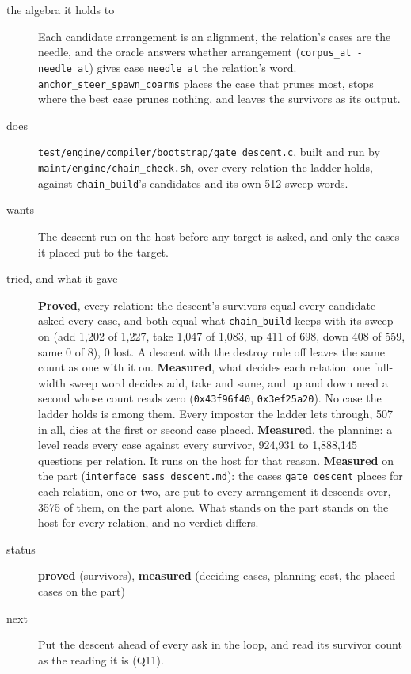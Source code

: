 \begin{description}
\item[{the algebra it holds to}] Each candidate arrangement is an alignment, the relation's cases are the needle, and the oracle answers whether arrangement (\texttt{corpus\_\allowbreak{}at -\allowbreak{} needle\_\allowbreak{}at}) gives case \texttt{needle\_\allowbreak{}at} the relation's word. \texttt{anchor\_\allowbreak{}steer\_\allowbreak{}spawn\_\allowbreak{}coarms} places the case that prunes most, stops where the best case prunes nothing, and leaves the survivors as its output.
\item[{does}] \texttt{test/\allowbreak{}engine/\allowbreak{}compiler/\allowbreak{}bootstrap/\allowbreak{}gate\_\allowbreak{}descent.\allowbreak{}c}, built and run by \texttt{maint/\allowbreak{}engine/\allowbreak{}chain\_\allowbreak{}check.\allowbreak{}sh}, over every relation the ladder holds, against \texttt{chain\_\allowbreak{}build}'s candidates and its own 512 sweep words.
\item[{wants}] The descent run on the host before any target is asked, and only the cases it placed put to the target.
\item[{tried, and what it gave}] \textbf{Proved}, every relation: the descent's survivors equal every candidate asked every case, and both equal what \texttt{chain\_\allowbreak{}build} keeps with its sweep on (add 1,202 of 1,227, take 1,047 of 1,083, up 411 of 698, down 408 of 559, same 0 of 8), 0 lost. A descent with the destroy rule off leaves the same count as one with it on. \textbf{Measured}, what decides each relation: one full-width sweep word decides add, take and same, and up and down need a second whose count reads zero (\texttt{0x43f96f40}, \texttt{0x3ef25a20}). No case the ladder holds is among them. Every impostor the ladder lets through, 507 in all, dies at the first or second case placed. \textbf{Measured}, the planning: a level reads every case against every survivor, 924,931 to 1,888,145 questions per relation. It runs on the host for that reason. \textbf{Measured} on the part (\texttt{interface\_\allowbreak{}sass\_\allowbreak{}descent.\allowbreak{}md}): the cases \texttt{gate\_\allowbreak{}descent} places for each relation, one or two, are put to every arrangement it descends over, 3575 of them, on the part alone. What stands on the part stands on the host for every relation, and no verdict differs.
\item[{status}] \textbf{proved} (survivors), \textbf{measured} (deciding cases, planning cost, the placed cases on the part)
\item[{next}] Put the descent ahead of every ask in the loop, and read its survivor count as the reading it is (Q11).
\end{description}

